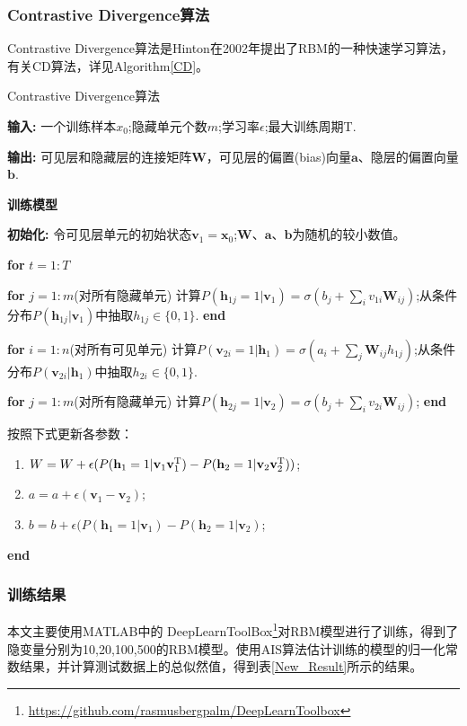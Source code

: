 \documentclass[11pt]{article}
\begin{document}
\subsubsection{Contrastive Divergence算法}
Contrastive Divergence算法是Hinton在2002年提出了RBM的一种快速学习算法\cite{CD}，
有关CD算法，详见Algorithm\ref{CD}。
\begin{algorithm}[t] 
\caption{Contrastive Divergence算法} 

\textbf{输入:} 一个训练样本$x_{0}$;隐藏单元个数$m$;学习率$\epsilon$;最大训练周期T.

\textbf{输出:} 可见层和隐藏层的连接矩阵$\mathbf{W}$，可见层的偏置(bias)向量$\mathbf{a}$、隐层的偏置向量$\mathbf{b}$.

\textbf{训练模型}

\textbf{初始化:} 令可见层单元的初始状态$\mathbf{v}_{1} = \mathbf{x}_{0}$;$\mathbf{W}$、$\mathbf{a}$、$\mathbf{b}$为随机的较小数值。

\textbf{for} $t=1:T$

\textbf{for} $j=1:m$(对所有隐藏单元)
计算$P(\mathbf{h}_{1j} = 1\vert\mathbf{v}_{1}) = \sigma(b_{j}+\sum_{i}v_{1i}\mathbf{W}_{ij})$;从条件分布$P(\mathbf{h}_{1j}\vert\mathbf{v}_{1})$中抽取$h_{1j}\in\{0,1\}$. 
\textbf{end}

\textbf{for} $i=1:n$(对所有可见单元)
计算$P(\mathbf{v}_{2i} = 1\vert\mathbf{h}_{1}) = \sigma(a_{i}+\sum_{j}\mathbf{W}_{ij}h_{1j})$;从条件分布$P(\mathbf{v}_{2i}\vert\mathbf{h}_{1})$中抽取$h_{2i}\in\{0,1\}$.

\textbf{for} $j=1:m$(对所有隐藏单元)
计算$P(\mathbf{h}_{2j} = 1\vert\mathbf{v}_{2}) = \sigma(b_{j}+\sum_{i}v_{2i}\mathbf{W}_{ij})$;
\textbf{end}

按照下式更新各参数：
\begin{enumerate} 
  \item $W  = W+\epsilon(P(\mathbf{h}_{1}=1\vert\mathbf{v}_{1}\mathbf{v}_{1}^{\rm T})-P(\mathbf{h}_{2}=1\vert\mathbf{v}_{2}\mathbf{v}_{2}^{\rm T}))$;

  \item $a = a+\epsilon(\mathbf{v}_{1}-\mathbf{v}_{2})$;

  \item $b  = b+\epsilon(P(\mathbf{h}_{1}=1\vert\mathbf{v}_{1})-P(\mathbf{h}_{2}=1\vert\mathbf{v}_{2})$;
\end{enumerate}

\textbf{end}
\label{CD} 
\end{algorithm}

\subsubsection{训练结果}
本文主要使用MATLAB中的
DeepLearnToolBox\footnote{\url{https://github.com/rasmusbergpalm/DeepLearnToolbox}}对RBM模型进行了训练，得到了隐变量分别为10,20,100,500的RBM模型。使用AIS算法估计训练的模型的归一化常数结果，并计算测试数据上的总似然值，得到表\ref{New_Result}所示的结果。
\end{document}
